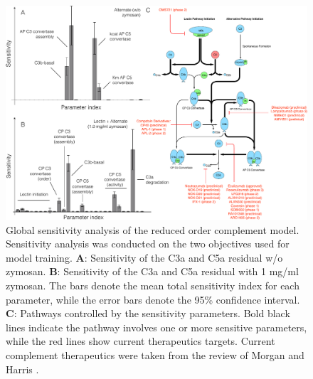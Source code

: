 \documentclass[12pt]{article}
\begin{document}
\begin{figure}[h]
\centering
\includegraphics[width=1.1\textwidth]{./figs/Figure4_Sensitivity_v3.pdf}
\caption{Global sensitivity analysis of the reduced order complement model.
Sensitivity analysis was conducted on the two objectives used for model training.
\textbf{A}: Sensitivity of the C3a and C5a residual w/o zymosan.
\textbf{B}: Sensitivity of the C3a and C5a residual with 1 mg/ml zymosan.
The bars denote the mean total sensitivity index for each parameter, while the error bars denote the 95\% confidence interval.
\textbf{C}: Pathways controlled by the sensitivity parameters.
Bold black lines indicate the pathway involves one or more sensitive parameters, while the red lines show current therapeutics targets.
Current complement therapeutics were taken from the review of Morgan and Harris \cite{morgan2015complement}. }\label{fig-SA}
\end{figure}
\end{document}
